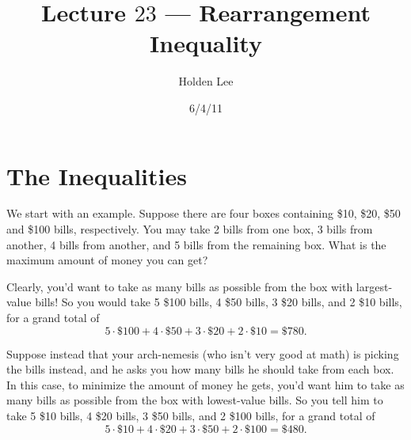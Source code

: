 
\pagestyle{fancy}





%
%

\title{Lecture $23$ --- Rearrangement Inequality}%
\author{Holden Lee}
\date{6/4/11}%
\maketitle
\thispagestyle{empty}
\section{The Inequalities}
We start with an example. 
Suppose there are four boxes containing \$10, \$20, \$50 and \$100 bills, respectively. You may take 2 bills from one box, 3 bills from another, 4 bills from another, and 5 bills from the remaining box. What is the maximum amount of money you can get?

Clearly, you'd want to take as many bills as possible from the box with largest-value bills! So you would take 5 \$100 bills, 4 \$50 bills, 3 \$20 bills, and 2 \$10 bills, for a grand total of
\begin{equation}\label{rearr1}
5\cdot \$100+4\cdot \$50+3\cdot \$20+2\cdot \$10=\$780.
\end{equation}

Suppose instead that your arch-nemesis (who isn't very good at math) is picking the bills instead, and he asks you how many bills he should take from each box. In this case, to minimize the amount of money he gets, you'd want him to take as many bills as possible from the box with lowest-value bills. So you tell him to take 5 \$10 bills, 4 \$20 bills, 3 \$50 bills, and 2 \$100 bills, for a grand total of
\begin{equation}\label{rearr2}
5\cdot \$10+4\cdot \$20+3\cdot \$50+2\cdot \$100=\$480.
\end{equation}

